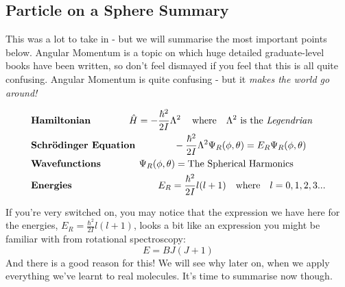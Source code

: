 \documentclass{memoir}[11pt,oneside,a4paper,openany]
\newenvironment{myblock}[1]{%
    \tcolorbox[beamer,%
    noparskip,breakable,
    colback=LightBlue,colframe=DarkBlue,%
    colbacklower=DarkBlue!75!LightBlue,%
    title=#1]}%
    {\endtcolorbox}
\newcommand{\wf}{\ensuremath{\Psi}\xspace}
\begin{document}
\subsection{Particle on a Sphere Summary}
This was a lot to take in - but we will summarise the most important points below. Angular Momentum is a topic on which huge detailed graduate-level books have been written, so don't feel dismayed if you feel that this is all quite confusing. Angular Momentum is quite confusing - but it \emph{makes the world go around!}


\begin{myblock}{\begin{center}Particle on a Sphere\end{center}}
	\begin{center}
		\begin{align*} & \text{\textbf{Hamiltonian}} \qquad\qquad \hat{H} = -\frac{\hbar^2}{2I}\Lambda^2 \,\quad  \text{where} \quad \Lambda^2 \,\,\text{is the \emph{Legendrian}} \\
			& \text{\textbf{Schr{\"o}dinger Equation}} \qquad\qquad -\frac{\hbar^2}{2I}\Lambda^2 \wf_R(\phi,\theta) = E_R \wf_R(\phi,\theta) \\
			& \text{\textbf{Wavefunctions}} \qquad\qquad \wf_R(\phi,\theta) = \text{The Spherical Harmonics} \\
			& \text{\textbf{Energies}} \qquad\qquad\qquad\qquad\quad E_R = \frac{\hbar^2}{2I}l(l+1) \quad \text{where} \quad l=0,1,2,3...
	\end{align*}
	\end{center}
\end{myblock}

If you're very switched on, you may notice that the expression we have here for the energies, $E_R = \frac{\hbar^2}{2I}l(l+1)$, looks a bit like an expression you might be familiar with from rotational spectroscopy:
\begin{equation}
	E = BJ(J+1)
\end{equation}
And there is a good reason for this! We will see why later on, when we apply everything we've learnt to real molecules. It's time to summarise now though.
\end{document}
